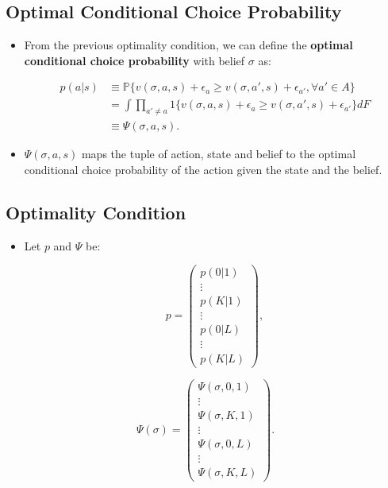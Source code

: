 \documentclass[]{book}
\providecommand{\tightlist}{%
  \setlength{\itemsep}{0pt}\setlength{\parskip}{0pt}}
\begin{document}
\subsection{Optimal Conditional Choice
Probability}\label{optimal-conditional-choice-probability}

\begin{itemize}
\tightlist
\item
  From the previous optimality condition, we can define the
  \textbf{optimal conditional choice probability} with belief \(\sigma\)
  as:

  \begin{equation}
  \begin{split}
  p(a|s) &\equiv \mathbb{P}\{v(\sigma, a, s) + \epsilon_{a} \ge v(\sigma, a', s) + \epsilon_{a'}, \forall a' \in A\}\\
  &= \int \prod_{a' \neq a} 1\{v(\sigma, a, s) + \epsilon_{a} \ge v(\sigma, a', s) + \epsilon_{a'}\} dF\\
  &\equiv \Psi(\sigma, a, s).
  \end{split}
  \end{equation}
\item
  \(\Psi(\sigma, a, s)\) maps the tuple of action, state and belief to
  the optimal conditional choice probability of the action given the
  state and the belief.
\end{itemize}

\subsection{Optimality Condition}\label{optimality-condition-1}

\begin{itemize}
\tightlist
\item
  Let \(p\) and \(\Psi\) be:

  \begin{equation}
  p = 
  \begin{pmatrix}
  p(0|1)\\
  \vdots\\
  p(K|1)\\
  \vdots\\
  p(0|L)\\
  \vdots\\
  p(K|L)
  \end{pmatrix},
  \end{equation}
\end{itemize}

\begin{equation}
\Psi(\sigma) = 
\begin{pmatrix}
\Psi(\sigma, 0, 1)\\
\vdots\\
\Psi(\sigma, K, 1)\\
\vdots\\
\Psi(\sigma, 0, L)\\
\vdots\\
\Psi(\sigma, K, L)
\end{pmatrix}.
\end{equation}
\end{document}
